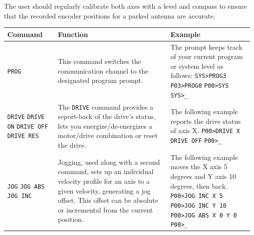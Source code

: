 \documentclass[titlepage]{article}
\begin{document}
The user should regularly calibrate both axes with a level and compass to ensure that the recorded encoder positions for a parked antenna are accurate.

\begin{table}[ht]
  \begin{center}
    \begin{tabularx}{\linewidth}{p{2cm}|>{\raggedright\arraybackslash}X|>{\raggedright\arraybackslash}X}
      Command          & Function & Example \\ \hline

      \lstinline|PROG| &
      This command switches the communication channel to the designated
      program prompt. &
      The prompt keeps track of your current program or system level as follows: \newline
      \lstinline|SYS>PROG3| \newline
      \lstinline|P03>PROG0| \newline
      \lstinline|P00>SYS| \newline
      \lstinline|SYS>_|
      \\

      \lstinline|DRIVE| \newline
      \lstinline|DRIVE ON| \newline
      \lstinline|DRIVE OFF| \newline
      \lstinline|DRIVE RES|
      &
      The \lstinline|DRIVE| command provides a report-back of the drive's status, lets you
      energize/de-energizes a motor/drive combination or reset the drive. &
      The following example reports the drive status of axis X. \newline
      \lstinline|P00>DRIVE X| \newline
      \lstinline|DRIVE OFF| \newline
      \lstinline|P00>_|
      \\

      \lstinline|JOG| \newline
      \lstinline|JOG ABS| \newline
      \lstinline|JOG INC| &

      Jogging, used along with a second command, sets up an individual velocity profile for an axis to a given velocity, generating a jog offset. This offset can be absolute or incremental from the current position. &
      The following example moves the X axis 5 degrees and Y axis 10 degrees, then back. \newline
      \lstinline|P00>JOG INC X 5| \newline
      \lstinline|P00>JOG INC Y 10| \newline
      \lstinline|P00>JOG ABS X 0 Y 0| \newline
      \lstinline|P00>_|
      \\


\end{tabularx}
\end{center}
\end{table}
\end{document}
